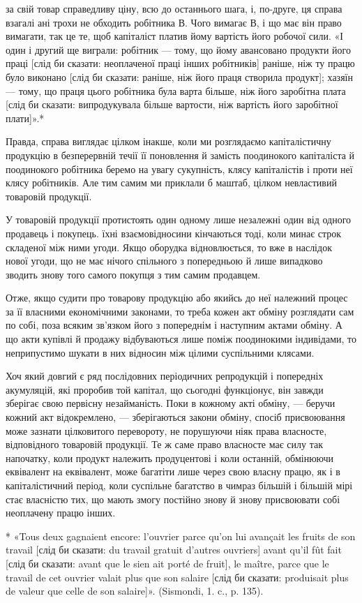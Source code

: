за свій товар справедливу ціну, всю до останнього шага, і, по-друге,
ця справа взагалі ані трохи не обходить робітника В. Чого вимагає
В, і що має він право вимагати, так це те, щоб капіталіст
платив йому вартість його робочої сили. «І один і другий ще
виграли: робітник — тому, що йому авансовано продукти його
праці [слід би сказати: неоплаченої праці інших робітників]
раніше, ніж ту працю було виконано [слід би сказати: раніше,
ніж його праця створила продукт]; хазяїн — тому, що праця
цього робітника була варта більше, ніж його заробітна плата
[слід би сказати: випродукувала більше вартости, ніж вартість
його заробітної плати]».*

Правда, справа виглядає цілком інакше, коли ми розглядаємо
капіталістичну продукцію в безперервній течії її поновлення
й замість поодинокого капіталіста й поодинокого робітника
беремо на увагу сукупність, клясу капіталістів і проти
неї клясу робітників. Але тим самим ми приклали б маштаб,
цілком невластивий товаровій продукції.

У товаровій продукції протистоять один одному лише незалежні
один від одного продавець і покупець. їхні взаємовідносини
кінчаються тоді, коли минає строк складеної між ними угоди.
Якщо оборудка відновлюється, то вже в наслідок нової угоди,
що не має нічого спільного з попередньою й лише випадково
зводить знову того самого покупця з тим самим продавцем.

Отже, якщо судити про товарову продукцію або якийсь до
неї належний процес за її власними економічними законами,
то треба кожен акт обміну розглядати сам по собі, поза всяким
зв’язком його з попереднім і наступним актами обміну. А що акти
купівлі й продажу відбуваються лише поміж поодинокими індивідами,
то неприпустимо шукати в них відносин між цілими
суспільними клясами.

Хоч який довгий є ряд послідовних періодичних репродукцій
і попередніх акумуляцій, які проробив той капітал, що сьогодні
функціонує, він завжди зберігає свою первісну незайманість.
Поки в кожному акті обміну, — беручи кожний акт відокремлено, —
зберігаються закони обміну, спосіб присвоювання може зазнати
цілковитого перевороту, не порушуючи ніяк права власносте,
відповідного товаровій продукції. Те ж саме право власносте
має силу так напочатку, коли продукт належить продуцентові
і коли останній, обмінюючи еквівалент на еквівалент, може багатіти
лише через свою власну працю, як і в капіталістичний період,
коли суспільне багатство в чимраз більшій і більшій мірі
стає власністю тих, що мають змогу постійно знову й знову присвоювати
собі неоплачену працю інших.

* «Tous deux gagnaient encore: l'ouvrier parce qu’on lui avançait les
fruits de son travail [слід би сказати: du travail gratuit d’autres ouvriers]
avant qu’il fût fait [слід би сказати: avant que le sien ait porté de fruit],
le maître, parce que le travail de cet ouvrier valait plus que son salaire
[слід би сказати: produisait plus de valeur que celle de son salaire]».
(Sismondi, 1. c., p. 135).
